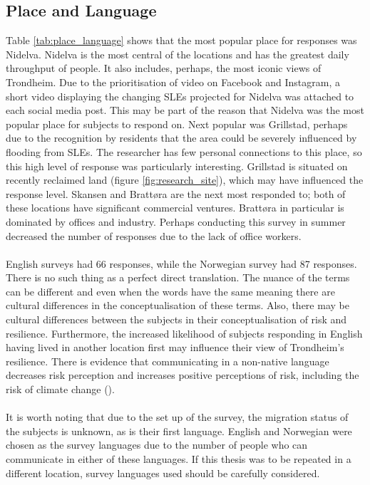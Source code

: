 \subsection{Place and Language}
Table \ref{tab:place_language} shows that the most popular place for responses was Nidelva. Nidelva is the most central of the locations and has the greatest daily throughput of people. It also includes, perhaps, the most iconic views of Trondheim. Due to the prioritisation of video on Facebook and Instagram, a short video displaying the changing SLEs projected for Nidelva was attached to each social media post. This may be part of the reason that Nidelva was the most popular place for subjects to respond on.  Next popular was Grillstad, perhaps due to the recognition by residents that the area could be severely influenced by flooding from SLEs. The researcher has few personal connections to this place, so this high level of response was particularly interesting. Grillstad is situated on recently reclaimed land (figure \ref{fig:research_site}), which may have influenced the response level. Skansen and Brattøra are the next most responded to; both of these locations have significant commercial ventures. Brattøra in particular is dominated by offices and industry. Perhaps conducting this survey in summer decreased the number of responses due to the lack of office workers. 
\paragraph{}
English surveys had 66 responses, while the Norwegian survey had 87 responses. There is no such thing as a perfect direct translation. The nuance of the terms can be different and even when the words have the same meaning there are cultural differences in the conceptualisation of these terms. Also, there may be cultural differences between the subjects in their conceptualisation of risk and resilience. Furthermore, the increased likelihood of subjects responding in English having lived in another location first may influence their view of Trondheim's resilience. There is evidence that communicating in a non-native language decreases risk perception and increases positive perceptions of risk, including the risk of climate change (\cite{hadjichristidis_effect_2015}).

\paragraph{}
It is worth noting that due to the set up of the survey, the migration status of the subjects is unknown, as is their first language. English and Norwegian were chosen as the survey languages due to the number of people who can communicate in either of these languages. If this thesis was to be repeated in a different location, survey languages used should be carefully considered.


